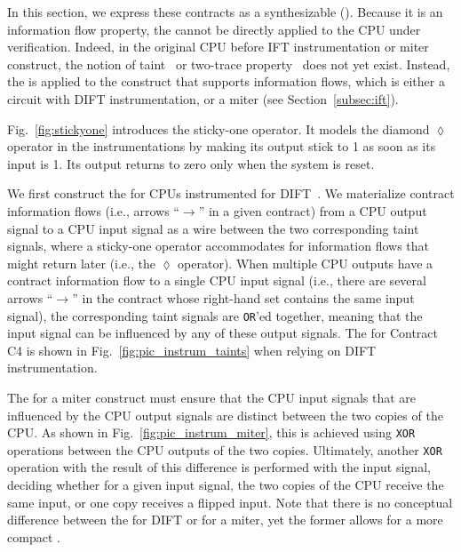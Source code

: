 
In this section, we express these contracts as a synthesizable \pici (\PICI).
Because it is an information flow property, the \PICI cannot be directly applied to the CPU under verification.
Indeed, in the original CPU before IFT instrumentation or miter construct, the notion of taint~\cite{solt2022cellift,ceesay2024mucfi} or two-trace property~\cite{wang2023specification,dinesh2024conjunct,dinesh2025h,tan2025contractshadowlogic} does not yet exist.
Instead, the \PICI is applied to the construct that supports information flows, which is either a circuit with DIFT instrumentation, or a miter (see Section~\ref{subsec:ift}).

Fig.~\ref{fig:stickyone} introduces the sticky-one operator.
It models the diamond $\lozenge$ operator in the instrumentations by making its output stick to 1 as soon as its input is 1.
Its output returns to zero only when the system is reset.

We first construct the \PICI for CPUs instrumented for DIFT~\cite{tiwari2009complete,solt2022cellift}.
We materialize contract information flows (i.e., arrows ``$\rightarrow$'' in a given contract) from a CPU output signal to a CPU input signal as a wire between the two corresponding taint signals, where a sticky-one operator accommodates for information flows that might return later (i.e., the $\lozenge$ operator).
When multiple CPU outputs have a contract information flow to a single CPU input signal (i.e., there are several arrows ``$\rightarrow$'' in the contract whose right-hand set contains the same input signal), the corresponding taint signals are \texttt{OR}'ed together, meaning that the input signal can be influenced by any of these output signals.
The \PICI for Contract C4 is shown in Fig.~\ref{fig:pic_instrum_taints} when relying on DIFT instrumentation.

The \PICI for a miter construct must ensure that the CPU input signals that are influenced by the CPU output signals are distinct between the two copies of the CPU.
As shown in Fig.~\ref{fig:pic_instrum_miter}, this is achieved using \texttt{XOR} operations between the CPU outputs of the two copies.
Ultimately, another \texttt{XOR} operation with the result of this difference is performed with the input signal, deciding whether for a given input signal, the two copies of the CPU receive the same input, or one copy receives a flipped input.
Note that there is no conceptual difference between the \PICI for DIFT or for a miter, yet the former allows for a more compact \PICI.

